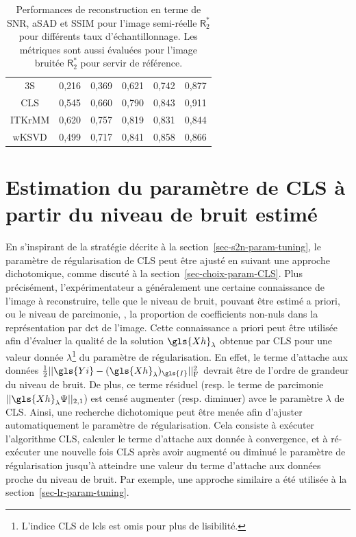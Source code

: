 \begin{table}[h!]
{\begin{tabular}{*{6}{c}}
            3S&0,216&0,369&0,621&0,742&0,877\\
            CLS&0,545&0,660&0,790&0,843&0,911\\
            ITKrMM&0,620&0,757&0,819&0,831&0,844\\
            wKSVD&0,499&0,717&0,841&0,858&0,866\\
            \bottomrule
        \end{tabular}
    }
    \caption{Performances de reconstruction en terme de SNR, aSAD et SSIM pour l'image semi-réelle $\mathsf{R}_2^*$ pour différents taux d'échantillonnage. Les métriques sont aussi évaluées pour l'image bruitée $\mathsf{R}_2^*$ pour servir de référence.
        \protect\label{table-higher-samp-ratio}}
\end{table}



%
\section{Estimation du paramètre de CLS à partir du niveau de bruit estimé}\label{sec-lcls-param-estim}

En s'inspirant de la stratégie décrite à la section~\ref{sec-s2n-param-tuning}, le paramètre de régularisation de CLS peut être ajusté en suivant une approche dichotomique, comme discuté à la section~\ref{sec-choix-param-CLS}. Plus précisément, l'expérimentateur a généralement une certaine connaissance de l'image à reconstruire, telle que le niveau de bruit, pouvant être estimé a priori, ou le niveau de parcimonie, \ie{}, la proportion de coefficients non-nuls dans la représentation par \gls{dct} de l'image. Cette connaissance a priori peut être utilisée afin d'évaluer la qualité de la solution $\gls{Xh}_{\lambda}$ obtenue par CLS pour une valeur donnée $\lambda$\footnote{L'indice CLS de \gls{lcls} est omis pour plus de lisibilité.} du paramètre de régularisation. En effet, le terme d'attache aux données $\frac{1}{2} \frobnorm{\gls{Yi} - (\gls{Xh}_\lambda)_{\gls{I}}}$ devrait être de l'ordre de grandeur du niveau de bruit. De plus, ce terme résiduel (resp. le terme de parcimonie $||\gls{Xh}_\lambda\Psi||_{2, 1}$)  est censé augmenter (resp. diminuer) avce le paramètre $\lambda$ de CLS. Ainsi, une recherche dichotomique peut être menée afin d'ajuster automatiquement le paramètre de régularisation. Cela consiste à exécuter l'algorithme CLS, calculer le terme d'attache aux donnée à convergence, et à ré-exécuter une nouvelle fois CLS après avoir augmenté ou diminué le paramètre de régularisation jusqu'à atteindre une valeur du terme d'attache aux données proche du niveau de bruit. Par exemple, une approche similaire a été utilisée à la section~\ref{sec-lr-param-tuning}.

